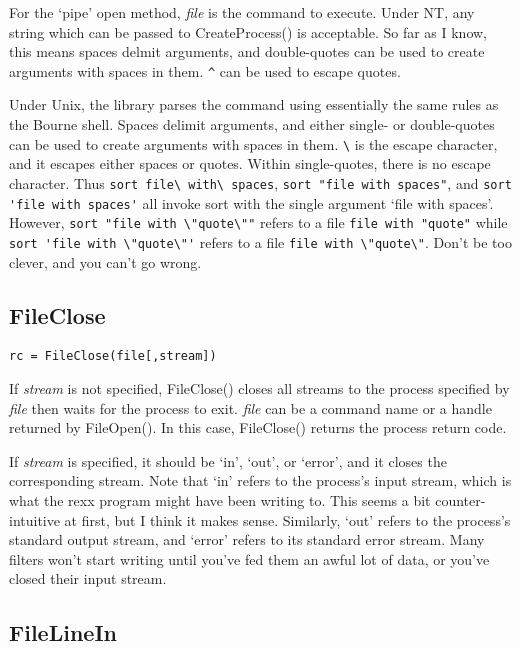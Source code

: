 \documentclass{article}
\begin{document}
For the `pipe' open method, {\it file} is the command to execute. Under NT,
any string which can be passed to CreateProcess() is acceptable. So far
as I know, this means spaces delmit arguments, and double-quotes can be used
to create arguments with spaces in them.
\verb|^| can be used to escape quotes.

Under Unix, the library parses
the command using essentially the same rules as the Bourne shell.
Spaces delimit arguments, and either single- or double-quotes can be used to
create arguments with spaces in them. \verb|\| is the escape character,
and it escapes either spaces or quotes. Within single-quotes, there is no
escape character. Thus \verb|sort file\ with\ spaces|,
\verb|sort "file with spaces"|, and \verb|sort 'file with spaces'| all
invoke sort with the single argument `file with spaces'. However,
\verb|sort "file with \"quote\""|
refers to a file
\verb|file with "quote"| while
\verb|sort 'file with \"quote\"'| refers to a file
\verb|file with \"quote\"|.
Don't be too clever, and you can't go wrong.

\subsection{FileClose}

\begin{verbatim}
rc = FileClose(file[,stream])
\end{verbatim}

If {\it stream} is not specified, FileClose() closes all streams to the
process specified by {\it file} then waits for the process to exit.
{\it file} can be a command name or a handle returned by FileOpen(). 
In this case, FileClose() returns the process return code.

If {\it stream} is specified, it should be `in', `out', or `error', and
it closes the corresponding stream. Note that `in' refers to the
process's input stream, which is what the rexx program might have been
writing to. This seems a bit counter-intuitive at first, but I think
it makes sense. Similarly, `out' refers to the process's standard output
stream, and `error' refers to its standard error stream. Many filters
won't start writing until you've fed them an awful lot of data, or
you've closed their input stream.

\subsection{FileLineIn}
\end{document}
